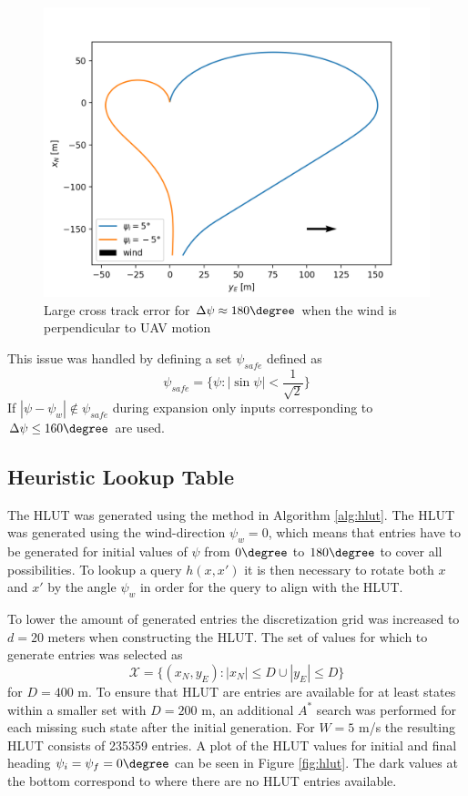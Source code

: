 \begin{figure}
    \begin{center}
        \includegraphics[width=.7\linewidth]{fig/prim_diff_hdg}        
    \end{center}
    \caption{Large cross track error for $\Delta\psi\approx180\degree$ when the wind is perpendicular to UAV motion}
    \label{fig:hdg_diff_wind}
\end{figure}

This issue was handled by defining a set $\psi_{safe}$ defined as 
\begin{equation}
    \psi_{safe}=\{\psi: |\sin\psi|<\frac{1}{\sqrt{2}}\}
\end{equation}
If $|\psi-\psi_w|\notin\psi_{safe}$ during expansion only inputs corresponding to $\Delta\psi\leq160\degree$ are used.

\subsection{Heuristic Lookup Table}
The HLUT was generated using the method in Algorithm \ref{alg:hlut}. The HLUT was generated using the wind-direction $\psi_w=0$, which means that 
entries have to be generated for initial values of $\psi$ from $0\degree$ to $180\degree$ to cover all possibilities. To lookup a query $h(x, x')$ it is then 
necessary to rotate both $x$ and $x'$ by the angle $\psi_w$ in order for the query to align with the HLUT. 

To lower the amount of generated entries the discretization grid was increased to $d=20$ meters when constructing the HLUT. The set of 
values for which to generate entries was selected as 
\begin{equation}
    \mathcal{X}=\{(x_N,y_E): |x_N|\leq D \cup |y_E| \leq D\}
\end{equation}
for $D=400$ m. To ensure that HLUT are entries are available for at least states within a smaller set with $D=200$ m, an additional 
$A^*$ search was performed for each missing such state after the initial generation. For $W=5$ m/s the resulting HLUT consists of 235359 entries. 
A plot of the HLUT values for initial and final heading $\psi_i=\psi_f=0\degree$ can be seen in Figure \ref{fig:hlut}. The dark values at the bottom correspond to where there are no HLUT entries available. 

